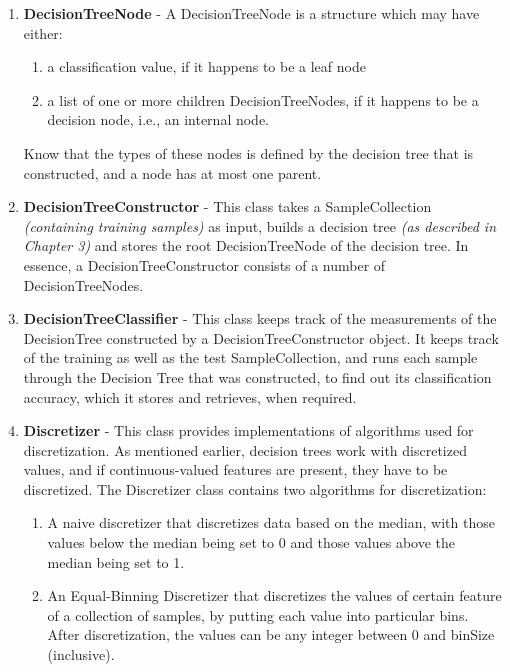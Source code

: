 \documentclass[12pt]{report}
\begin{document}
\begin{enumerate}

\item{\textbf{DecisionTreeNode}} - A DecisionTreeNode is a structure which may have either:

\begin{enumerate}
\item{a classification value, if it happens to be a leaf node}
\item{a list of one or more children DecisionTreeNodes, if it happens to be a decision node, i.e., an internal node.}
\end{enumerate}

Know that the types of these nodes is defined by the decision tree that is constructed, and a node has at most one parent.

\item{\textbf{DecisionTreeConstructor}} - This class takes a SampleCollection \textit{(containing training samples)} as input,  builds a decision tree \textit{(as described in Chapter 3)} and stores the root DecisionTreeNode of the decision tree. In essence, a DecisionTreeConstructor consists of a number of DecisionTreeNodes.

\item{\textbf{DecisionTreeClassifier}} - This class keeps track of the measurements of the DecisionTree constructed by a DecisionTreeConstructor object. It keeps track of the training as well as the test SampleCollection, and runs each sample through the Decision Tree that was constructed, to find out its classification accuracy, which it stores and retrieves, when required.


\item{\textbf{Discretizer}} - This class provides implementations of algorithms used for discretization. As mentioned earlier, decision trees work with discretized values, and if continuous-valued features are present, they have to be discretized. The Discretizer class contains two algorithms for discretization:
\begin{enumerate}
\item{A naive discretizer that discretizes data based on the median, with those values below the median being set to 0 and those values above the median being set to 1.}
\item{An Equal-Binning Discretizer that discretizes the values of certain feature of a collection of samples, by putting each value into particular bins. After discretization, the values can be any integer between 0 and binSize (inclusive).}
\end{enumerate}

\end{enumerate}
\end{document}
